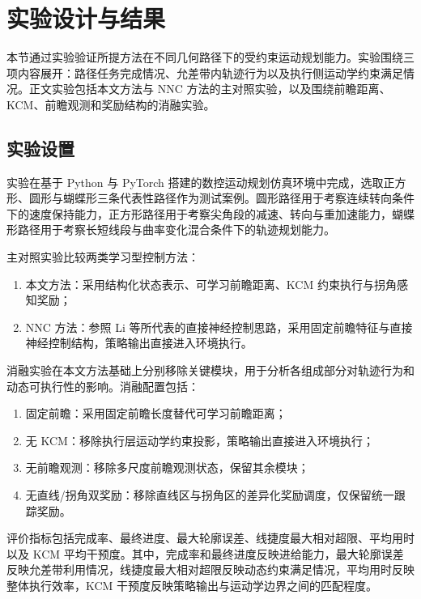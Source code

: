 \documentclass[preprint,12pt]{elsarticle}
\begin{document}
\section{实验设计与结果}
\label{sec:experiments}

本节通过实验验证所提方法在不同几何路径下的受约束运动规划能力。实验围绕三项内容展开：路径任务完成情况、允差带内轨迹行为以及执行侧运动学约束满足情况。正文实验包括本文方法与 NNC 方法的主对照实验，以及围绕前瞻距离、KCM、前瞻观测和奖励结构的消融实验。

\subsection{实验设置}

实验在基于 Python 与 PyTorch 搭建的数控运动规划仿真环境中完成，选取正方形、圆形与蝴蝶形三条代表性路径作为测试案例。圆形路径用于考察连续转向条件下的速度保持能力，正方形路径用于考察尖角段的减速、转向与重加速能力，蝴蝶形路径用于考察长短线段与曲率变化混合条件下的轨迹规划能力。

主对照实验比较两类学习型控制方法：
\begin{enumerate}[leftmargin=2em]
    \item 本文方法：采用结构化状态表示、可学习前瞻距离、KCM 约束执行与拐角感知奖励；
    \item NNC 方法：参照 Li 等\cite{Li2020}所代表的直接神经控制思路，采用固定前瞻特征与直接神经控制结构，策略输出直接进入环境执行。
\end{enumerate}

消融实验在本文方法基础上分别移除关键模块，用于分析各组成部分对轨迹行为和动态可执行性的影响。消融配置包括：
\begin{enumerate}[leftmargin=2em]
    \item 固定前瞻：采用固定前瞻长度替代可学习前瞻距离；
    \item 无 KCM：移除执行层运动学约束投影，策略输出直接进入环境执行；
    \item 无前瞻观测：移除多尺度前瞻观测状态，保留其余模块；
    \item 无直线/拐角双奖励：移除直线区与拐角区的差异化奖励调度，仅保留统一跟踪奖励。
\end{enumerate}

评价指标包括完成率、最终进度、最大轮廓误差、线捷度最大相对超限、平均用时以及 KCM 平均干预度。其中，完成率和最终进度反映进给能力，最大轮廓误差反映允差带利用情况，线捷度最大相对超限反映动态约束满足情况，平均用时反映整体执行效率，KCM 干预度反映策略输出与运动学边界之间的匹配程度。
\end{document}
